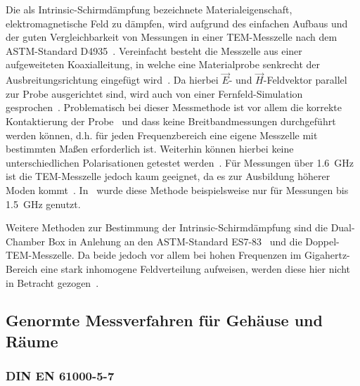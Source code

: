 Die als Intrinsic-Schirmdämpfung bezeichnete Materialeigenschaft, elektromagnetische Feld zu dämpfen, wird aufgrund des einfachen Aufbaus und der guten Vergleichbarkeit von Messungen in einer TEM-Messzelle nach dem ASTM-Standard D4935~\cite{ASTM_D4935, Measurement_Shielding_Textile_Materials_Free_Space_Transmission}. Vereinfacht besteht die Messzelle aus einer aufgeweiteten Koaxialleitung, in welche eine Materialprobe senkrecht der Ausbreitungsrichtung eingefügt wird~\cite{EM_Schirmung, Handbook_EMI_Vol_3}. Da hierbei $\vec E$- und $\vec H$-Feldvektor parallel zur Probe ausgerichtet sind, wird auch von einer Fernfeld-Simulation gesprochen~\cite{Techniques_Shielding_Effectiveness_Far_Field_Simulation, EMV}. Problematisch bei dieser Messmethode ist vor allem die korrekte Kontaktierung der Probe~\cite{EM_Schirmung} und dass keine Breitbandmessungen durchgeführt werden können, d.h. für jeden Frequenzbereich eine eigene Messzelle mit bestimmten Maßen erforderlich ist. Weiterhin können hierbei keine unterschiedlichen Polarisationen getestet werden~\cite{Techniques_Shielding_Effectiveness_Far_Field_Simulation}. Für Messungen über \SI{1,6}{\giga\hertz} ist die TEM-Messzelle jedoch kaum geeignet, da es zur Ausbildung höherer Moden kommt~\cite{EMV}. In~\cite{Measurement_Electromagnetic_Shielding_Effectiveness_Composite_Carbon_Nickel_Thinfilm} wurde diese Methode beispielsweise nur für Messungen bis \SI{1,5}{\giga\hertz} genutzt.
\par
\vspace{\linespace}
Weitere Methoden zur Bestimmung der Intrinsic-Schirmdämpfung sind die Dual-Chamber Box in Anlehung an den ASTM-Standard ES7-83~\cite{ASTM_ES7-83} und die Doppel-TEM-Messzelle. Da beide jedoch vor allem bei hohen Frequenzen im Gigahertz-Bereich eine stark inhomogene Feldverteilung aufweisen, werden diese hier nicht in Betracht gezogen~\cite{EM_Schirmung, EMV}.


\subsection{Genormte Messverfahren für Gehäuse und Räume}\label{cha:2_sub_Genormte_Messverfahren}

\subsubsection{DIN EN 61000-5-7}


